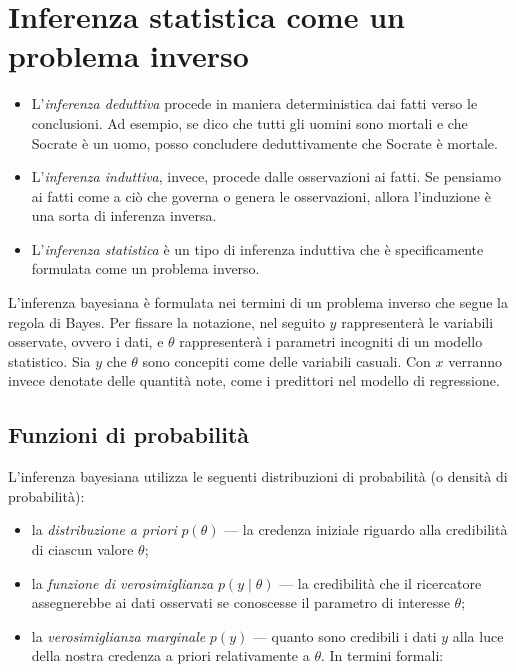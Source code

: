 \documentclass[
]{memoir}
\providecommand{\tightlist}{%
  \setlength{\itemsep}{0pt}\setlength{\parskip}{0pt}}
\theoremstyle{definition}
\theoremstyle{definition}
\theoremstyle{definition}
\theoremstyle{definition}
\theoremstyle{remark}
\begin{document}
\hypertarget{inferenza-statistica-come-un-problema-inverso}{%
\section{Inferenza statistica come un problema inverso}\label{inferenza-statistica-come-un-problema-inverso}}

\begin{itemize}
\item
  L'\emph{inferenza deduttiva} procede in maniera deterministica dai fatti verso le conclusioni. Ad esempio, se dico che tutti gli uomini sono mortali e che Socrate è un uomo, posso concludere deduttivamente che Socrate è mortale.
\item
  L'\emph{inferenza induttiva}, invece, procede dalle osservazioni ai fatti. Se pensiamo ai fatti come a ciò che governa o genera le osservazioni, allora l'induzione è una sorta di inferenza inversa.
\item
  L'\emph{inferenza statistica} è un tipo di inferenza induttiva che è specificamente formulata come un problema inverso.
\end{itemize}

L'inferenza bayesiana è formulata nei termini di un problema inverso che segue la regola di Bayes. Per fissare la notazione, nel seguito \(y\) rappresenterà le variabili osservate, ovvero i dati, e \(\theta\) rappresenterà i parametri incogniti di un modello statistico. Sia \(y\) che \(\theta\) sono concepiti come delle variabili casuali. Con \(x\) verranno invece denotate delle quantità note, come i predittori nel modello di regressione.

\hypertarget{funzioni-di-probabilituxe0}{%
\subsection{Funzioni di probabilità}\label{funzioni-di-probabilituxe0}}

L'inferenza bayesiana utilizza le seguenti distribuzioni di probabilità (o densità di probabilità):

\begin{itemize}
\tightlist
\item
  la \emph{distribuzione a priori} \(p(\theta)\) --- la credenza iniziale riguardo alla credibilità di ciascun valore \(\theta\);
\item
  la \emph{funzione di verosimiglianza} \(p(y \mid \theta)\) --- la credibilità che il ricercatore assegnerebbe ai dati osservati se conoscesse il parametro di interesse \(\theta\);
\item
  la \emph{verosimiglianza marginale} \(p(y)\) --- quanto sono credibili i dati \(y\) alla luce della nostra credenza a priori relativamente a \(\theta\). In termini formali:
\end{itemize}
\end{document}
